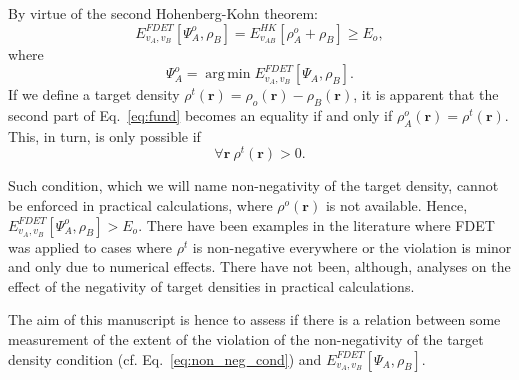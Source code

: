 \documentclass[journal=jctcce,manuscript=article, layout=twocolumn]{achemso}
\DeclareMathOperator*{\argmin}{arg\,min}
\begin{document}
By virtue of the second Hohenberg-Kohn theorem:
\begin{equation}\label{eq:fund}
 E_{v_A,v_B}^{FDET}[\Psi_{A}^{o},\rho_B] =  E_{v_{AB}}^{HK}[\rho_A^{o}+\rho_B] \ge E_o,
\end{equation}
where
\begin{equation} \label{eq:Psi_o}
 \Psi_{A}^{o} = \argmin E_{v_A,v_B}^{FDET}[\Psi_{A},\rho_B].
\end{equation}
If we define a target density $\rho^t(\mathbf{r}) = \rho_o(\mathbf{r}) - \rho_B(\mathbf{r})$, it is apparent that the second part of Eq.~\ref{eq:fund} becomes an equality if and only if $\rho_A^{o}(\mathbf{r}) = \rho^t(\mathbf{r})$. This, in turn, is only possible if
\begin{equation}\label{eq:non_neg_cond}
\forall \mathbf{r} \ \rho^t(\mathbf{r}) > 0. 
\end{equation}

Such condition, which we will name non-negativity of the target density, cannot be enforced in practical calculations, where $\rho^o(\mathbf{r})$ is not available. Hence, $E_{v_A,v_B}^{FDET}[\Psi_{A}^{o},\rho_B] > E_o$. There have been examples in the literature where FDET was applied to cases where $\rho^t$ is non-negative everywhere\cite{Wesolowski2013} or the violation is minor and only due to numerical effects\cite{Fux2010}. There have not been, although, analyses on the effect of the negativity of target densities in practical calculations.

The aim of this manuscript is hence to assess if there is a relation between some measurement of the extent of the violation of the non-negativity of the target density condition (cf. Eq.~\ref{eq:non_neg_cond}) and ${E}_{v_A,v_B}^{FDET}[\Psi_{A},\rho_B]$.
\end{document}
